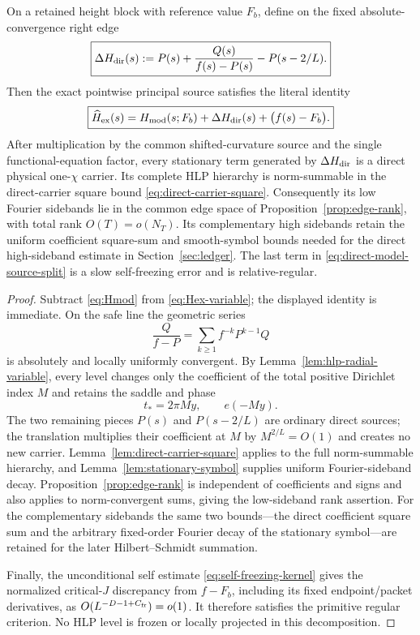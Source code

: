 \begin{proposition}
\label{prop:direct-exact-model-residual}
On a retained height block with reference value $F_b$, define on the fixed
absolute-convergence right edge
\begin{equation}
\boxed{
\Delta H_{\rm dir}(s)
:=P(s)+\frac{Q(s)}{f(s)-P(s)}-P(s-2/L).
}
\label{eq:direct-exact-model-residual}
\end{equation}
Then the exact pointwise principal source satisfies the literal identity
\begin{equation}
\boxed{
\widehat H_{\rm ex}(s)
=H_{\rm mod}(s;F_b)
+\Delta H_{\rm dir}(s)
+\bigl(f(s)-F_b\bigr).
}
\label{eq:direct-model-source-split}
\end{equation}
After multiplication by the common shifted-curvature source and the single
functional-equation factor, every stationary term generated by
$\Delta H_{\rm dir}$ is a direct physical one-$\chi$ carrier.  Its complete
HLP hierarchy is norm-summable in the direct-carrier square bound
\eqref{eq:direct-carrier-square}.  Consequently its low Fourier sidebands lie
in the common edge space of Proposition~\ref{prop:edge-rank}, with total rank
$O(T)=o(N_T)$.  Its complementary high sidebands retain the uniform coefficient
square-sum and smooth-symbol bounds needed for the direct high-sideband estimate
in Section~\ref{sec:ledger}.  The last term in
\eqref{eq:direct-model-source-split} is a slow self-freezing error and is
relative-regular.
\end{proposition}

\begin{proof}
Subtract \eqref{eq:Hmod} from \eqref{eq:Hex-variable}; the displayed identity
is immediate.  On the safe line the geometric series
\[
\frac{Q}{f-P}=\sum_{k\ge1}f^{-k}P^{k-1}Q
\]
is absolutely and locally uniformly convergent.  By
Lemma~\ref{lem:hlp-radial-variable}, every level changes only the coefficient
of the total positive Dirichlet index $M$ and retains the saddle and phase
\[
t_*=2\pi My,\qquad e(-My).
\]
The two remaining pieces $P(s)$ and $P(s-2/L)$ are ordinary direct sources; the
translation multiplies their coefficient at $M$ by $M^{2/L}=O(1)$ and creates
no new carrier.  Lemma~\ref{lem:direct-carrier-square} applies to the full
norm-summable hierarchy, and Lemma~\ref{lem:stationary-symbol} supplies uniform
Fourier-sideband decay.  Proposition~\ref{prop:edge-rank} is independent of
coefficients and signs and also applies to norm-convergent sums, giving the
low-sideband rank assertion.  For the complementary sidebands the same two
bounds---the direct coefficient square sum and the arbitrary fixed-order
Fourier decay of the stationary symbol---are retained for the later
Hilbert--Schmidt summation.

Finally, the unconditional self estimate
\eqref{eq:self-freezing-kernel} gives the normalized critical-$J$ discrepancy
from $f-F_b$, including its fixed endpoint/packet derivatives, as
$O(L^{-D-1+C_{\rm fr}})=o(1)$.  It therefore satisfies the primitive regular
criterion.  No HLP level
is frozen or locally projected in this decomposition.
\end{proof}

